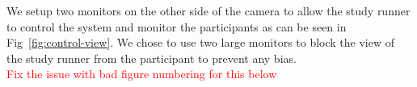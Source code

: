 We setup two monitors on the other side of the camera to allow the study runner to control the system and monitor the participants as can be seen in Fig~\ref{fig:control-view}. We chose to use two large monitors to block the view of the study runner from the participant to prevent any bias. \\



\textcolor{red}{Fix the issue with bad figure numbering for this below}
\begin{invisBox}  
	\hfill
\end{invisBox}

